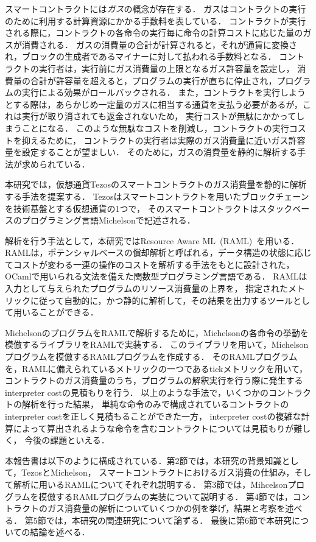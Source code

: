 \documentclass{kuisthesis}
\begin{document}
スマートコントラクトには\emph{ガス}の概念が存在する\cite{tezos}．
ガスはコントラクトの実行のために利用する計算資源にかかる手数料を表している．
コントラクトが実行される際に，コントラクトの各命令の実行毎に命令の計算コストに応じた量のガスが消費される．
ガスの消費量の合計が計算されると，それが通貨に変換され，ブロックの生成者であるマイナーに対して払われる手数料となる．
コントラクトの実行者は，実行前にガス消費量の上限となるガス許容量を設定し，
消費量の合計が許容量を超えると，プログラムの実行が直ちに停止され，プログラムの実行による効果がロールバックされる．
また，コントラクトを実行しようとする際は，あらかじめ一定量のガスに相当する通貨を支払う必要があるが，これは実行が取り消されても返金されないため，
実行コストが無駄にかかってしまうことになる．
このような無駄なコストを削減し，コントラクトの実行コストを抑えるために，
コントラクトの実行者は実際のガス消費量に近いガス許容量を設定することが望ましい．
そのために，ガスの消費量を静的に解析する手法が求められている．

本研究では，仮想通貨Tezosのスマートコントラクトのガス消費量を静的に解析する手法を提案する．
Tezosはスマートコントラクトを用いたブロックチェーンを技術基盤とする仮想通貨の1つで，
そのスマートコントラクトはスタックベースのプログラミング言語Michelsonで記述される．

解析を行う手法として，本研究ではResource Aware ML\ (RAML)\ \cite{raml}を用いる．
RAMLは，ポテンシャルベースの償却解析と呼ばれる，データ構造の状態に応じてコストが変わる一連の操作のコストを解析する手法をもとに設計された\cite{amortized}，
OCamlで用いられる文法を備えた関数型プログラミング言語である．
RAMLは入力として与えられたプログラムのリソース消費量の上界を，
指定されたメトリックに従って自動的に，かつ静的に解析して，その結果を出力するツールとして用いることができる．

MichelsonのプログラムをRAMLで解析するために，Michelsonの各命令の挙動を模倣するライブラリをRAMLで実装する．
このライブラリを用いて，Michelsonプログラムを模倣するRAMLプログラムを作成する．
そのRAMLプログラムを，RAMLに備えられているメトリックの一つであるtickメトリックを用いて，
コントラクトのガス消費量のうち，プログラムの解釈実行を行う際に発生するinterpreter costの見積もりを行う．
以上のような手法で，いくつかのコントラクトの解析を行った結果，
単純な命令のみで構成されているコントラクトのinterpreter costを正しく見積もることができた一方，
interpreter costの複雑な計算によって算出されるような命令を含むコントラクトについては見積もりが難しく，
今後の課題といえる．

本報告書は以下のように構成されている．第2節では，本研究の背景知識として，TezosとMichelson，
スマートコントラクトにおけるガス消費の仕組み，そして解析に用いるRAMLについてそれぞれ説明する．
第3節では，Mihcelsonプログラムを模倣するRAMLプログラムの実装について説明する．
第4節では，コントラクトのガス消費量の解析についていくつかの例を挙げ，結果と考察を述べる．
第5節では，本研究の関連研究について論ずる．
最後に第6節で本研究についての結論を述べる．
\end{document}
